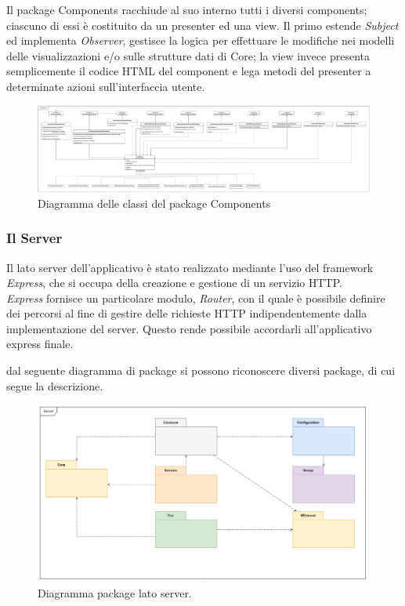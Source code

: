 \documentclass[../manuale_sviluppatore.tex]{subfiles}
\begin{document}
Il package Components racchiude al suo interno tutti i diversi components; ciascuno di essi è 
costituito da un presenter ed una view. Il primo estende \emph{Subject} ed implementa 
\emph{Observer}, gestisce la logica per effettuare le modifiche nei modelli delle visualizzazioni e/o 
sulle strutture dati di Core; la view invece presenta semplicemente il codice HTML del component e 
lega metodi del presenter a determinate azioni sull'interfaccia utente.

\begin{figure}[H]
	\centering
	\includegraphics[width=18cm]{src/img/components.pdf}
	\caption{Diagramma delle classi del package Components}
\end{figure}

\subsubsection{Il Server}

Il lato server dell'applicativo è stato realizzato mediante l'uso del framework \emph{Express}, che 
si occupa della creazione e gestione di un servizio HTTP. \\
\emph{Express} fornisce un particolare modulo, \emph{Router}, con il quale è possibile definire dei 
percorsi al fine di gestire delle richieste HTTP indipendentemente dalla implementazione del server. 
Questo rende possibile accordarli all'applicativo express finale.

\par dal seguente diagramma di package si possono riconoscere diversi package, di cui segue la 
descrizione.\\

\begin{figure}[H]
	\centering
	\includegraphics[width=18cm]{src/img/package-server.png}
	\caption{Diagramma package lato server.}
\end{figure}
\end{document}
